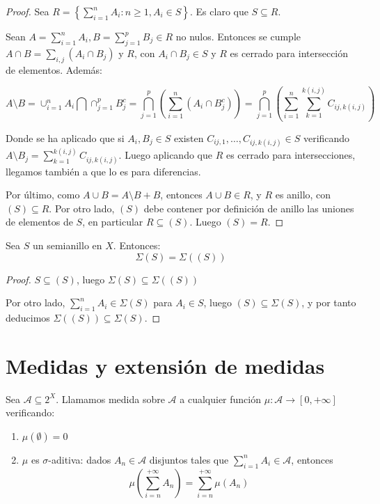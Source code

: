 \begin{proof}
 Sea $R= \left\{\sum_{i=1}^n A_i:  n\ge 1, A_i \in S\right\}$. Es claro que $S\subseteq R$.
 
 Sean $A = \sum_{i=1}^n A_i, B = \sum_{j=1}^p B_j \in R$ no nulos. Entonces se cumple 
 $A\cap B = \sum_{i,j} (A_i \cap B_j)$ y $R$, con $A_i\cap B_j \in S$ y $R$ es cerrado para intersección de 
 elementos. Además:
 
 \[A\setminus B = \cup_{i=1}^n A_i \bigcap \cap_{j=1}^p B_j^c = \bigcap_{j=1}^p 
                  \left(\sum_{i=1}^n (A_i \cap B_j^c)\right) = 
                  \bigcap_{j=1}^p \left(\sum_{i=1}^n \sum_{k=1}^{k(i,j)} C_{ij,k(i,j)} \right)\]
 
 Donde se ha aplicado que si $A_i, B_j \in S$ existen $C_{ij,1}, \ldots, C_{ij,k(i,j)} \in S$ verificando
 $A\setminus B_j =\sum_{k=1}^{k(i,j)} C_{ij,k(i,j)}$. Luego aplicando que $R$ es cerrado para intersecciones, 
 llegamos también a que lo es para diferencias.
 
 Por último, como $A\cup B = A \setminus B + B$, entonces $A \cup B \in R$, y $R$ es anillo, con $(S) \subseteq R$.
 Por otro lado, $(S)$ debe contener por definición de anillo las uniones de elementos de $S$, en particular
 $R\subseteq (S)$. Luego $(S) = R$.
\end{proof}


\begin{fact}
 Sea $S$ un semianillo en $X$. Entonces:
 \[\Sigma(S) = \Sigma((S))\]
\end{fact}

\begin{proof}
 $S\subseteq (S)$, luego $\Sigma(S) \subseteq \Sigma((S))$
 
 Por otro lado, $\sum_{i=1}^n A_i \in \Sigma(S)$ para $A_i \in S$, luego $(S) \subseteq \Sigma(S)$, y por tanto
 deducimos $\Sigma((S)) \subseteq \Sigma(S)$.
\end{proof}



\section{Medidas y extensión de medidas}

\begin{definition}[Medida]
 Sea $\mathcal{A} \subseteq 2^X$. Llamamos medida sobre $\mathcal{A}$ a cualquier función 
 $\mu: \mathcal{A} \rightarrow [0, +\infty]$ verificando:

 \begin{enumerate}[i]
  \item $\mu(\emptyset) = 0$
  \item $\mu$ es $\sigma$-aditiva: dados $A_n \in \mathcal{A}$ disjuntos tales que $\sum_{i=1}^n A_i \in \mathcal{A}$, 
  entonces \[\mu\left(\sum_{i=n}^{+\infty} A_n \right)= \sum_{i=n}^{+\infty} \mu(A_n)\]
 \end{enumerate}
\end{definition}

